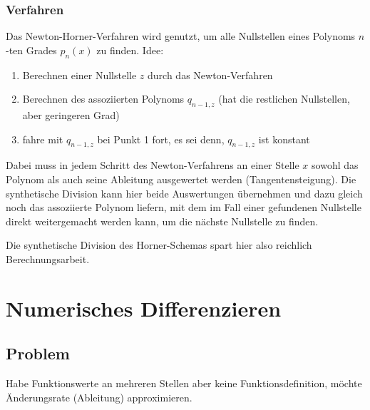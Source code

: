 \documentclass[a4paper, 12pt]{article}
\begin{document}
\subsubsection*{Verfahren}
Das Newton-Horner-Verfahren wird genutzt, um alle Nullstellen eines Polynoms \(n\)-ten Grades \(p_n(x)\) zu finden. Idee:
\begin{enumerate}
  \item Berechnen einer Nullstelle \(z\) durch das Newton-Verfahren
  \item Berechnen des assoziierten Polynoms \(q_{n-1,z}\) (hat die restlichen Nullstellen, aber geringeren Grad)
  \item fahre mit \(q_{n-1,z}\) bei Punkt 1 fort, es sei denn, \(q_{n-1,z}\) ist konstant
\end{enumerate}
Dabei muss in jedem Schritt des Newton-Verfahrens an einer Stelle \(x\) sowohl das Polynom als auch seine Ableitung ausgewertet werden (Tangentensteigung). Die synthetische Division kann hier beide Auswertungen übernehmen und dazu gleich noch das assoziierte Polynom liefern, mit dem im Fall einer gefundenen Nullstelle direkt weitergemacht werden kann, um die nächste Nullstelle zu finden.

Die synthetische Division des Horner-Schemas spart hier also reichlich Berechnungsarbeit.



\section{Numerisches Differenzieren}


\subsection{Problem}
Habe Funktionswerte an mehreren Stellen aber keine Funktionsdefinition, möchte Änderungsrate (Ableitung) approximieren.
\end{document}
